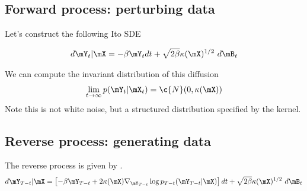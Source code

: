 \subsection{Forward process: perturbing data}
%
Let's construct the following Ito SDE
\begin{definition}
\begin{align}
d\mY_t|\mX = -\beta \mY_t dt + \sqrt{2\beta} \kappa(\mX)^{1/2} ~d\mB_t
\end{align}
\end{definition}
We can compute the invariant distribution of this diffusion
\begin{align}
    \lim_{t \to \infty} p(\mY_t | \mX_t) = \c{N}(0, \kappa(\mX))
\end{align}
Note this is not white noise, but a structured distribution specified by the kernel.


\subsection{Reverse process: generating data}
The reverse process is given by \cite{anderson1982reverse}.
\begin{align}
d\mY_{T-t}|\mX = \left[ -\beta \mY_{T-t} + 2 \kappa(\mX) \nabla_{\mY_{T-t}} \log p_{T-t}(\mY_{T-t} | \mX)\right] dt + \sqrt{2\beta} \kappa(\mX)^{1/2} ~d\mB_t
\end{align}
%

